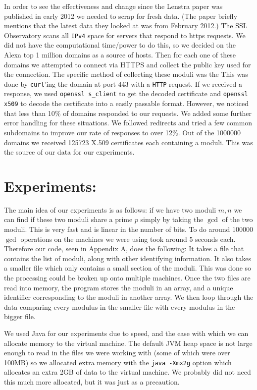\documentclass[12pt]{article}
\newcommand{\ty}[1]{\texttt{#1}}
\begin{document}
In order to see the effectiveness and change since the Lenstra paper was
published in early 2012 we needed to scrap for fresh data. (The paper briefly
mentions that the latest data they looked at was from February 2012.) The SSL
Observatory scans all \ty{IPv4} space for servers that respond to https requests. We
did not have the computational time/power to do this, so we decided on the Alexa
top 1 million domains as a source of hosts. Then for each one of these domains
we attempted to connect via HTTPS and collect the public key used for the
connection. The specific method of collecting these moduli was the  This was
done by \ty{curl}'ing the domain at port 443 with a \ty{HTTP} request. If we received a
response, we used \ty{openssl s\_client} to get the decoded certificate and
\ty{openssl x509} to decode the certificate into a easily passable format.
However, we noticed that less than 10\% of domains responded to our requests. We
added some further error handling for these situations. We followed redirects
and tried a few common subdomains to improve our rate of responses to over 12\%.
Out of the 1000000 domains we received 125723 X.509 certificates each containing
a moduli. This was the source of our data for our experiments.

\section{Experiments:}
The main idea of our experiments is as follows: if we have two moduli $m, n$ we
can find if these two moduli share a prime $p$ simply by taking the $\gcd$ of
the two moduli. This is very fast and is linear in the number of bits. To do
around 100000 $\gcd$ operations on the machines we were using took around 5
seconds each. Therefore our code, seen in Appendix A, does the following: It
takes a file that contains the list of moduli, along with other identifying 
information. It also takes a smaller file which only contains a small section of
the moduli. This was done so the processing could be broken up onto multiple
machines. Once the two files are read into memory, the program stores the moduli
in an array, and a unique identifier corresponding to the moduli in another
array. We then loop through the data comparing every modulus in the smaller file
with every modulus in the bigger file.

We used Java for our experiments due to speed, and the ease with which we can
allocate memory to the virtual machine. The default JVM heap space is not large
enough to read in the files we were working with (some of which were over 100MB)
so we allocated extra memory with the \ty{java -Xmx2g} option which allocates an
extra 2GB of data to the virtual machine. We probably did not need this much
more allocated, but it was just as a precaution.
\end{document}
